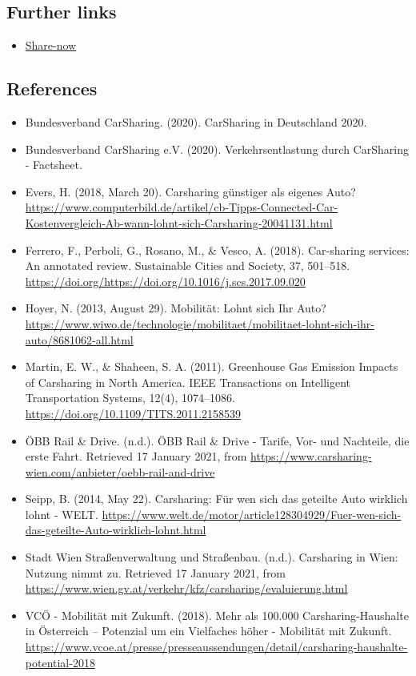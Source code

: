 \documentclass[
]{book}
\providecommand{\tightlist}{%
  \setlength{\itemsep}{0pt}\setlength{\parskip}{0pt}}
\begin{document}
\hypertarget{further-links-35}{%
\subsection*{Further links}\label{further-links-35}}

\begin{itemize}
\tightlist
\item
  \href{https://www.share-now.com/at/en/faq/}{Share-now}
\end{itemize}

\hypertarget{references-42}{%
\subsection*{References}\label{references-42}}

\begin{itemize}
\tightlist
\item
  Bundesverband CarSharing. (2020). CarSharing in Deutschland 2020.
\item
  Bundesverband CarSharing e.V. (2020). Verkehrsentlastung durch CarSharing - Factsheet.
\item
  Evers, H. (2018, March 20). Carsharing günstiger als eigenes Auto? \url{https://www.computerbild.de/artikel/cb-Tipps-Connected-Car-Kostenvergleich-Ab-wann-lohnt-sich-Carsharing-20041131.html}
\item
  Ferrero, F., Perboli, G., Rosano, M., \& Vesco, A. (2018). Car-sharing services: An annotated review. Sustainable Cities and Society, 37, 501--518. \url{https://doi.org/https://doi.org/10.1016/j.scs.2017.09.020}
\item
  Hoyer, N. (2013, August 29). Mobilität: Lohnt sich Ihr Auto? \url{https://www.wiwo.de/technologie/mobilitaet/mobilitaet-lohnt-sich-ihr-auto/8681062-all.html}
\item
  Martin, E. W., \& Shaheen, S. A. (2011). Greenhouse Gas Emission Impacts of Carsharing in North America. IEEE Transactions on Intelligent Transportation Systems, 12(4), 1074--1086. \url{https://doi.org/10.1109/TITS.2011.2158539}
\item
  ÖBB Rail \& Drive. (n.d.). ÖBB Rail \& Drive - Tarife, Vor- und Nachteile, die erste Fahrt. Retrieved 17 January 2021, from \url{https://www.carsharing-wien.com/anbieter/oebb-rail-and-drive}
\item
  Seipp, B. (2014, May 22). Carsharing: Für wen sich das geteilte Auto wirklich lohnt - WELT. \url{https://www.welt.de/motor/article128304929/Fuer-wen-sich-das-geteilte-Auto-wirklich-lohnt.html}
\item
  Stadt Wien \textbar{} Straßenverwaltung und Straßenbau. (n.d.). Carsharing in Wien: Nutzung nimmt zu. Retrieved 17 January 2021, from \url{https://www.wien.gv.at/verkehr/kfz/carsharing/evaluierung.html}
\item
  VCÖ - Mobilität mit Zukunft. (2018). Mehr als 100.000 Carsharing-Haushalte in Österreich -- Potenzial um ein Vielfaches höher - Mobilität mit Zukunft. \url{https://www.vcoe.at/presse/presseaussendungen/detail/carsharing-haushalte-potential-2018}
\end{itemize}
\end{document}
